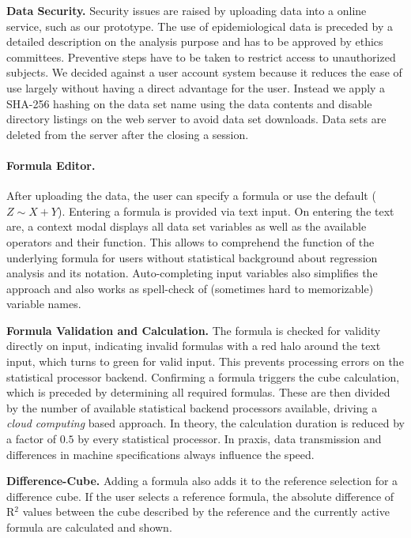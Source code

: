 \documentclass[journal]{style/vgtc} 			          %
\begin{document}
\textbf{Data Security.}
Security issues are raised by uploading data into a online service, such as our prototype.
The use of epidemiological data is preceded by a detailed description on the analysis purpose and has to be approved by ethics committees.
Preventive steps have to be taken to restrict access to unauthorized subjects.
We decided against a user account system because it reduces the ease of use largely without having a direct advantage for the user.
Instead we apply a SHA-256 hashing on the data set name using the data contents and disable directory listings on the web server to avoid data set downloads.
Data sets are deleted from the server after the closing a session.

\paragraph{Formula Editor.}
After uploading the data, the user can specify a formula or use the default ($Z \sim X + Y$).
Entering a formula is provided via text input.
On entering the text are, a context modal displays all data set variables as well as the available operators and their function.
This allows to comprehend the function of the underlying formula for users without statistical background about regression analysis and its notation.
Auto-completing input variables also simplifies the approach and also works as spell-check of (sometimes hard to memorizable) variable names.

\textbf{Formula Validation and Calculation.} The formula is checked for validity directly on input, indicating invalid formulas with a red halo around the text input, which turns to green for valid input.
This prevents processing errors on the statistical processor backend.
Confirming a formula triggers the cube calculation, which is preceded by determining all required formulas.
These are then divided by the number of available statistical backend processors available, driving a \emph{cloud computing} based approach.
In theory, the calculation duration is reduced by a factor of $0.5$ by every statistical processor.
In praxis, data transmission and differences in machine specifications always influence the speed.

\textbf{Difference-Cube.}
Adding a formula also adds it to the reference selection for a difference cube.
If the user selects a reference formula, the absolute difference of R$^2$ values between the cube described by the reference and the currently active formula are calculated and shown.
\end{document}
